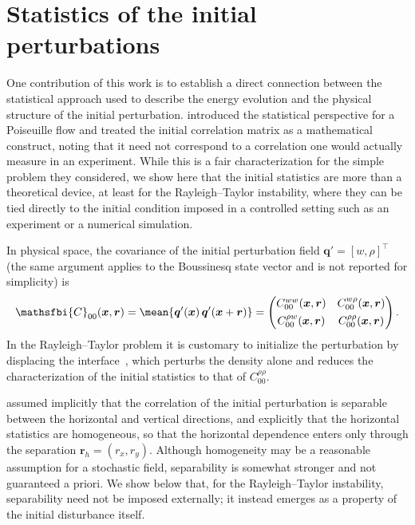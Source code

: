 \section{Statistics of the initial perturbations}
\label{sec:statistics_of_the_incoming_perturbations}
One contribution of this work is to establish a direct connection between the statistical approach used to describe the energy evolution and the physical structure of the initial perturbation. \citet{frame-towne-2024} introduced the statistical perspective for a Poiseuille flow and treated the initial correlation matrix as a mathematical construct, noting that it need not correspond to a correlation one would actually measure in an experiment. While this is a fair characterization for the simple problem they considered, we show here that the initial statistics are more than a theoretical device, at least for the Rayleigh--Taylor instability, where they can be tied directly to the initial condition imposed in a controlled setting such as an experiment or a numerical simulation.

In physical space, the covariance of the initial perturbation field \(\boldsymbol{q}'=[w,\rho]^\top\) (the same argument applies to the Boussinesq state vector and is not reported for simplicity) is
\begin{equation}
    \mathsfbi{C}_{00}(\boldsymbol{x},\boldsymbol{r})
    =
    \mean{
      \boldsymbol{q}'(\boldsymbol{x})\,
      \boldsymbol{q}'(\boldsymbol{x}+\boldsymbol{r})
    }
    =
    \begin{pmatrix}
        C_{00}^{ww}(\boldsymbol{x},\boldsymbol{r}) & C_{00}^{w\rho}(\boldsymbol{x},\boldsymbol{r}) \\[4pt]
        C_{00}^{\rho w}(\boldsymbol{x},\boldsymbol{r}) & C_{00}^{\rho\rho}(\boldsymbol{x},\boldsymbol{r})
    \end{pmatrix}.
    \label{eq:physical_covariance_general}
\end{equation}
In the Rayleigh--Taylor problem it is customary to initialize the perturbation by displacing the interface~\citep{cook-dimotakis-2001}, which perturbs the density alone and reduces the characterization of the initial statistics to that of \(C_{00}^{\rho\rho}\).

\citet{frame-towne-2024} assumed implicitly that the correlation of the initial perturbation is separable between the horizontal and vertical directions, and explicitly that the horizontal statistics are homogeneous, so that the horizontal dependence enters only through the separation \(\boldsymbol{r}_h=(r_x,r_y)\). Although homogeneity may be a reasonable assumption for a stochastic field, separability is somewhat stronger and not guaranteed a priori. We show below that, for the Rayleigh--Taylor instability, separability need not be imposed externally; it instead emerges as a property of the initial disturbance itself.

